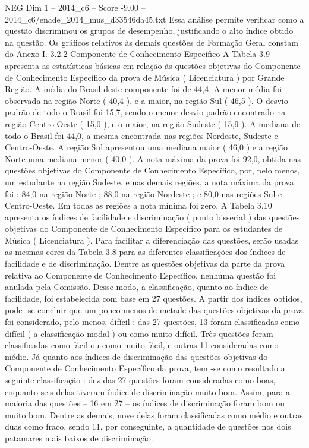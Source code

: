 \begin{textsample}{NEG Dim 1 – 2014\_c6 – Score -9.00 – 2014\_c6/enade\_2014\_mus\_d33546da45.txt}
Essa análise permite verificar como a questão discriminou os grupos de desempenho, justificando o alto índice obtido na questão.
Os gráficos relativos às demais questões de Formação Geral constam do Anexo I. 3.2.2 Componente de Conhecimento Específico A Tabela 3.9 apresenta as estatísticas básicas em relação às questões objetivas do Componente de Conhecimento Específico da prova de Música ( Licenciatura ) por Grande Região.
A média do Brasil deste componente foi de 44,4.
A menor média foi observada na região Norte ( 40,4 ), e a maior, na região Sul ( 46,5 ).
O desvio padrão de todo o Brasil foi 15,7, sendo o menor desvio padrão encontrado na região Centro-Oeste ( 15,0 ), e o maior, na região Sudeste ( 15,9 ).
A mediana de todo o Brasil foi 44,0, a mesma encontrada nas regiões Nordeste, Sudeste e Centro-Oeste.
A região Sul apresentou uma mediana maior ( 46,0 ) e a região Norte uma mediana menor ( 40,0 ).
A nota máxima da prova foi 92,0, obtida nas questões objetivas do Componente de Conhecimento Específico, por, pelo menos, um estudante na região Sudeste, e nas demais regiões, a nota máxima da prova foi : 84,0 na região Norte ; 88,0 na região Nordeste ; e 80,0 nas regiões Sul e Centro-Oeste.
Em todas as regiões a nota mínima foi zero.
A Tabela 3.10 apresenta os índices de facilidade e discriminação ( ponto bisserial ) das questões objetivas do Componente de Conhecimento Específico para os estudantes de Música ( Licenciatura ).
Para facilitar a diferenciação das questões, serão usadas as mesmas cores da Tabela 3.8 para as diferentes classificações dos índices de facilidade e de discriminação.
Dentre as questões objetivas da parte da prova relativa ao Componente de Conhecimento Específico, nenhuma questão foi anulada pela Comissão.
Desse modo, a classificação, quanto ao índice de facilidade, foi estabelecida com base em 27 questões.
A partir dos índices obtidos, pode -se concluir que um pouco menos de metade das questões objetivas da prova foi considerado, pelo menos, difícil : das 27 questões, 13 foram classificadas como difícil ( a classificação modal ) ou como muito difícil.
Três questões foram classificadas como fácil ou como muito fácil, e outras 11 consideradas como médio.
Já quanto aos índices de discriminação das questões objetivas do Componente de Conhecimento Específico da prova, tem -se como resultado a seguinte classificação : dez das 27 questões foram consideradas como boas, enquanto seis delas tiveram índice de discriminação muito bom.
Assim, para a maioria das questões – 16 em 27 – os índices de discriminação foram bom ou muito bom.
Dentre as demais, nove delas foram classificadas como médio e outras duas como fraco, sendo 11, por conseguinte, a quantidade de questões nos dois patamares mais baixos de discriminação.

\end{textsample}
